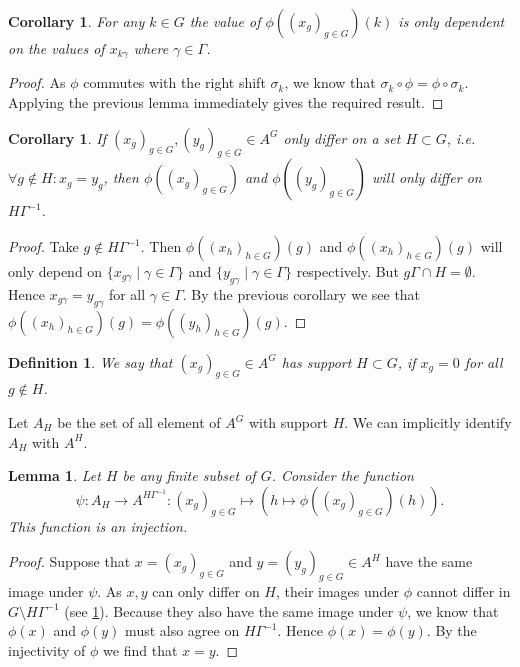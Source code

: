 \documentclass[titlepage, a4paper]{article}
\theoremstyle{theoremdd}
\newtheorem{lemma}[theorem]{Lemma}
\newtheorem{corollary}[theorem]{Corollary}
\theoremstyle{definitiondd}
\newtheorem{definition}[theorem]{Definition}
\theoremstyle{remarkdd}
\begin{document}
\begin{corollary}
	For any $k \in G$ the value of $\phi((x_g)_{g \in G})(k)$ is only dependent on the values of $x_{k\gamma}$ where $\gamma \in \Gamma$.
\end{corollary}	
\begin{proof}
	As $\phi$ commutes with the right shift  $\sigma_k$, we know that $\sigma_k \circ \phi = \phi \circ \sigma_k$. Applying the previous lemma immediately gives the required result.
\end{proof}

\begin{corollary}\label{cor:differ_in_image}
	If $(x_g)_{g \in G}, (y_g)_{g\in G} \in A^{G}$ only differ on a set $H \subset G$, i.e. $\forall g \not\in H:x_g = y_g$,
	then  $\phi((x_g)_{g \in G})$ and $\phi((y_g)_{g \in G})$ will only differ on $H\Gamma^{-1}$.
\end{corollary}
\begin{proof}
	Take $g \not\in H\Gamma^{-1}$. Then $\phi((x_h)_{h \in G})(g)$ and $\phi((x_h)_{h\in G})(g)$ will only depend on  $\{x_{g\gamma}\mid \gamma \in \Gamma\}$ and $\{y_{g\gamma}\mid \gamma \in \Gamma\}$ respectively. But  $g\Gamma \cap H = \emptyset$. Hence $x_{g\gamma} = y_{g\gamma}$ for all $\gamma \in \Gamma$. By the previous corollary we see that $\phi((x_h)_{h \in G})(g) = \phi((y_h)_{h \in G})(g)$.
\end{proof}

\begin{definition}
	We say that $(x_g)_{g \in G} \in A^{G}$ has support $H \subset G$, if $x_g = 0$ for all $g \not\in H$.
\end{definition}
Let $A_H$ be the set of all element of  $A^{G}$ with support $H$. We can implicitly identify $A_H$ with $A^{H}$.

\begin{lemma}\label{lem:injective_restriction}
	Let $H$ be any finite subset of $G$. Consider the function  \[
		\psi:A_H \to A ^{H\Gamma^{-1}}: (x_g)_{g \in G} \mapsto \left(h \mapsto \phi((x_g)_{g \in G})(h)\right)
	.\]  
	This function is an injection. 
\end{lemma}
\begin{proof}
	Suppose that $x= (x_g)_{g \in G}$ and $ y = (y_g)_{g \in G} \in A^{H}$ have the same image under $\psi$. As $x, y$ can only differ on $ H$, their images under $\phi$ cannot differ in $G\setminus H\Gamma^{-1}$ (see \cref{cor:differ_in_image}). Because they also have the same image under $\psi$, we know that $\phi(x)$ and $\phi(y)$ must also agree on $H\Gamma^{-1}$. Hence $\phi(x) = \phi(y)$. By the injectivity of $\phi$ we find that $x = y$.
\end{proof}
\end{document}
